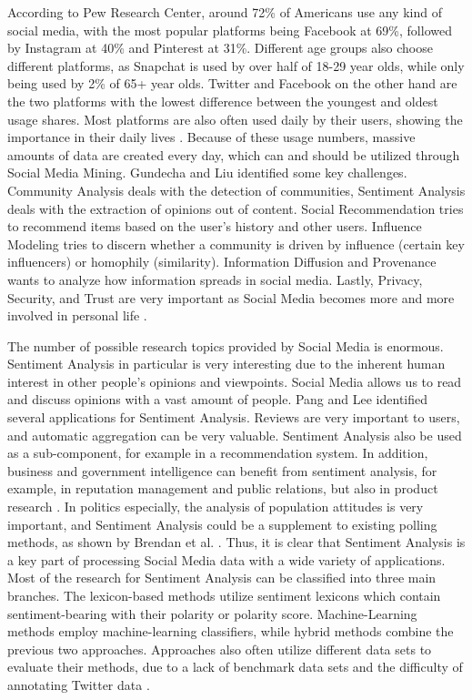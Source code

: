 According to Pew Research Center, around 72\% of Americans use any kind of social media, with the most popular platforms being Facebook at 69\%, followed by Instagram at 40\% and Pinterest at 31\%. Different age groups also choose different platforms, as Snapchat is used by over half of 18-29 year olds, while only being used by 2\% of 65+ year olds. Twitter and Facebook on the other hand are the two platforms with the lowest difference between the youngest and oldest usage shares. Most platforms are also often used daily by their users, showing the importance in their daily lives \cite{pew:socialmedia}. Because of these usage numbers, massive amounts of data are created every day, which can and should be utilized through Social Media Mining. Gundecha and Liu identified some key challenges. Community Analysis deals with the detection of communities, Sentiment Analysis deals with the extraction of opinions out of content. Social Recommendation tries to recommend items based on the user's history and other users. Influence Modeling tries to discern whether a community is driven by influence (certain key influencers) or homophily (similarity). Information Diffusion and Provenance wants to analyze how information spreads in social media. Lastly, Privacy, Security, and Trust are very important as Social Media becomes more and more involved in personal life \cite{Gundecha2012MiningSM}.

The number of possible research topics provided by Social Media is enormous. Sentiment Analysis in particular is very interesting due to the inherent human interest in other people's opinions and viewpoints. Social Media allows us to read and discuss opinions with a vast amount of people. Pang and Lee identified several applications for Sentiment Analysis. Reviews are very important to users, and automatic aggregation can be very valuable. Sentiment Analysis also be used as a sub-component, for example in a recommendation system. In addition, business and government intelligence can benefit from sentiment analysis, for example, in reputation management and public relations, but also in product research \cite{pang-etal-2002-thumbs}. In politics especially, the analysis of population attitudes is very important, and Sentiment Analysis could be a supplement to existing polling methods, as shown by Brendan et al. \cite{polls}. 
Thus, it is clear that Sentiment Analysis is a key part of processing Social Media data with a wide variety of applications. Most of the research for Sentiment Analysis can be classified into three main branches. The lexicon-based methods utilize sentiment lexicons which contain sentiment-bearing with their polarity or polarity score. Machine-Learning methods employ machine-learning classifiers, while hybrid methods combine the previous two approaches. Approaches also often utilize different data sets to evaluate their methods, due to a lack of benchmark data sets and the difficulty of annotating Twitter data \cite{DBLP:journals/csur/GiachanouC16}.

